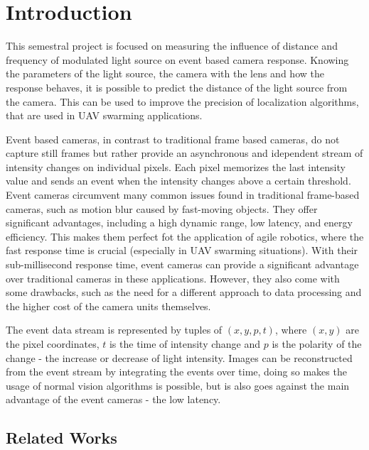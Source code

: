 
\chapter{Introduction\label{chap:introduction}}

This semestral project is focused on measuring the influence of distance and frequency of modulated
light source on event based camera response. Knowing the parameters of the light source, the camera with the lens
and how the response behaves, it is possible to predict the distance of the light source from the camera. This can be
used to improve the precision of localization algorithms, that are used in \ac{UAV} swarming applications. 

Event based cameras, in contrast to traditional frame based cameras, do not capture still frames but rather
provide an asynchronous and idependent stream of intensity changes on individual pixels.
Each pixel memorizes the last intensity value and sends an event when the intensity changes above a certain threshold.
Event cameras circumvent many common issues found in traditional frame-based cameras, such as motion blur caused
by fast-moving objects. They offer significant advantages, including a high dynamic range, low latency,
and energy efficiency.
This makes them perfect fot the application of agile robotics,
where the fast response time is crucial (especially in UAV swarming situations). With their sub-millisecond response time,
event cameras can provide a significant advantage over traditional cameras in these applications.
However, they also come with some drawbacks, such as the need for a different approach to
data processing and the higher cost of the camera units themselves. \cite{gallego2020event}

The event data stream is represented by tuples of $(x, y, p, t)$, where $(x, y)$ are the pixel coordinates, $t$ is the time of
intensity change and $p$ is the polarity of the change - the increase or decrease of light intensity. Images can be
reconstructed from the event stream by integrating the events over time, doing so makes the usage of normal vision 
algorithms is possible, but is also goes against the main advantage of the event cameras - the low latency.

\section{Related Works}


